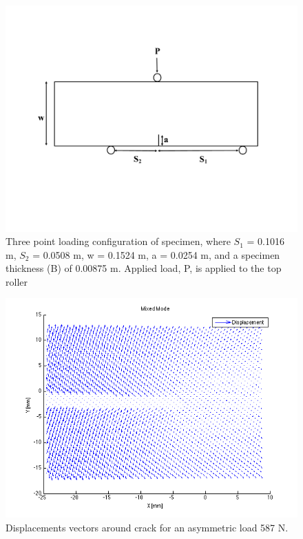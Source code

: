 \documentclass[12pt]{article}
\begin{document}
\begin{figure}[H]
	\centering
	\includegraphics[width=1\textwidth]{Geometry_Mixed.png}
	\caption{Three point loading configuration of specimen, where $S_{1}$ = 0.1016 m, $S_{2}$ = 0.0508 m, w = 0.1524 m, a = 0.0254 m, and a specimen thickness (B) of 0.00875 m. Applied load, P, is applied to the top roller}
	\label{fig:Geometry_Mixed}
\end{figure}
\begin{figure}[H]
	\centering
	\includegraphics[width=1\textwidth]{quiverMixedMode.png}
	\caption{Displacements vectors around crack for an asymmetric load 587 N.}
	\label{fig:QuiverMix}
\end{figure}
\end{document}
